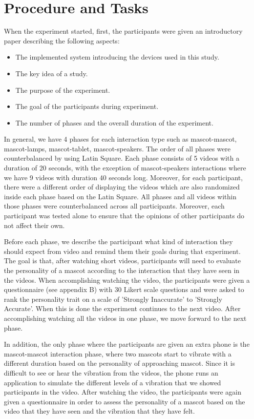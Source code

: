 \section{Procedure and Tasks}
\label{sec:procedure-and-tasks}
When the experiment started, first, the participants were given an introductory paper describing the following aspects:
\begin{itemize}
  \item The implemented system introducing the devices used in this study.
  \item The key idea of a study.
  \item The purpose of the experiment.
  \item The goal of the participants during experiment.
  \item The number of phases and the overall duration of the experiment.
\end{itemize}

In general, we have 4 phases for each interaction type such as mascot-mascot,
mascot-lamps, mascot-tablet, mascot-speakers.
The order of all phases were counterbalanced by using Latin Square.
Each phase consists of 5 videos with a duration of 20 seconds, with the exception of
mascot-speakers interactions where we have 9 videos with duration 40 seconds long.
Moreover, for each participant, there were a different order of displaying the videos
which are also randomized inside each phase based on the Latin Square.
All phases and all videos within those phases were counterbalanced across all participants.
Moreover, each participant was tested alone to ensure that the opinions of other participants do not affect their own.

Before each phase, we describe the participant what kind of interaction they should
expect from video and remind them their goals during that experiment.
The goal is that, after watching short videos, participants will need to evaluate the personality
of a mascot according to the interaction that they have seen in the videos.
When accomplishing watching the video, the participants were given a questionnaire
(see appendix B) with 30 Likert scale questions and were asked to rank the personality trait
on a scale of 'Strongly Inaccurate' to 'Strongly Accurate'.
When this is done the experiment continues to the next video.
After accomplishing watching all the videos in one phase, we move forward to the next phase.

In addition, the only phase where the participants are given an extra phone
is the mascot-mascot interaction phase, where two mascots start to vibrate
with a different duration based on the personality of approaching mascot.
Since it is difficult to see or hear the vibration from the videos, the phone runs an
application to simulate the different levels of a vibration that we showed participants in the video.
After watching the video, the participants were again given a questionnaire in order to assess
the personality of a mascot based on the video that they have seen and the vibration that they have felt.

